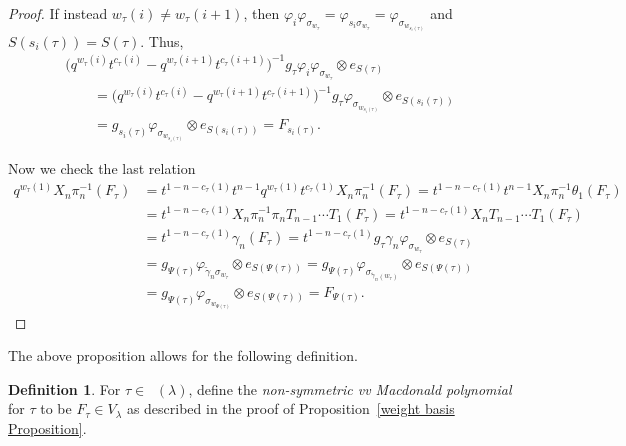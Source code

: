 \documentclass[10pt,a4paper]{amsart}
\numberwithin{equation}{section}
\theoremstyle{definition}
\newtheorem{Definition}[Theorem]{Definition}
\DeclareMathOperator{\PSYT}{\mathrm{PSYT}_{\geq 0}}
\begin{document}
\begin{proof}
 If instead $w_{\tau}(i) \neq w_{\tau}(i+1)$, then $\varphi_{i}\varphi_{\sigma_{w_{\tau}}} = \varphi_{s_i\sigma_{w_{\tau}}} = \varphi_{\sigma_{w_{s_i(\tau)}}}$ and $S(s_i(\tau)) = S(\tau)$. Thus,
 \begin{gather*}
 \bigl( q^{w_{\tau}(i)}t^{c_{\tau}(i)}-q^{w_{\tau}(i+1)}t^{c_{\tau}(i+1)}\bigr)^{-1}g_{\tau} \varphi_{i}\varphi_{\sigma_{w_{\tau}}} \otimes e_{S(\tau)} \\
 \qquad = \bigl( q^{w_{\tau}(i)}t^{c_{\tau}(i)}-q^{w_{\tau}(i+1)}t^{c_{\tau}(i+1)}\bigr)^{-1}g_{\tau}\varphi_{\sigma_{w_{s_i(\tau)}}} \otimes e_{S(s_i(\tau))} \\
 \qquad = g_{s_i(\tau)}\varphi_{\sigma_{w_{s_i(\tau)}}} \otimes e_{S(s_i(\tau))} = F_{s_i(\tau)}.
 \end{gather*}

 Now we check the last relation
 \begin{align*}
 q^{w_{\tau}(1)}X_n\pi_{n}^{-1}(F_{\tau}) &
 = t^{1-n-c_{\tau}(1)}t^{n-1}q^{w_{\tau}(1)}t^{c_{\tau}(1)}X_n\pi_{n}^{-1}(F_{\tau}) = t^{1-n-c_{\tau}(1)} t^{n-1}X_n\pi_{n}^{-1}\theta_1(F_{\tau}) \\
 & = t^{1-n-c_{\tau}(1)} X_n\pi_{n}^{-1}\pi_nT_{n-1}\cdots T_1(F_{\tau}) =t^{1-n-c_{\tau}(1)}X_nT_{n-1}\cdots T_1(F_{\tau}) \\
 &= t^{1-n-c_{\tau}(1)}\gamma_n(F_{\tau}) = t^{1-n-c_{\tau}(1)} g_{\tau} \gamma_n\varphi_{\sigma_{w_{\tau}}} \otimes e_{S(\tau)} \\
 &= g_{\Psi(\tau)} \varphi_{\widetilde{\gamma}_n\sigma_{w_{\tau}}} \otimes e_{S(\Psi(\tau))} = g_{\Psi(\tau)} \varphi_{\sigma_{\widetilde{\gamma}_n (w_{\tau})}} \otimes e_{S(\Psi(\tau))} \\
 &= g_{\Psi(\tau)} \varphi_{\sigma_{w_{\Psi(\tau)}}} \otimes e_{S(\Psi(\tau))}
 = F_{\Psi(\tau)}. \tag*{\qed}
 \end{align*} \renewcommand{\qed}{}
\end{proof}

The above proposition allows for the following definition.

\begin{Definition}
 For $\tau \in \PSYT(\lambda)$, define the \textit{non-symmetric vv Macdonald polynomial} for $\tau$ to be $F_{\tau} \in V_{\lambda}$ as described in the proof of Proposition~\ref{weight basis Proposition}.
\end{Definition}
\end{document}
